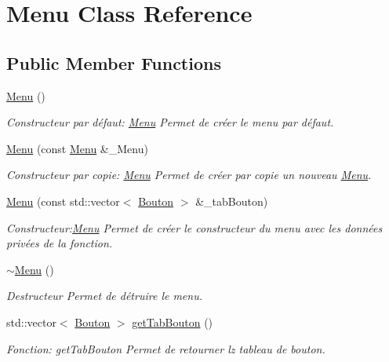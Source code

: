 \hypertarget{classMenu}{}\section{Menu Class Reference}
\label{classMenu}
\subsection*{Public Member Functions}
\begin{DoxyCompactItemize}
\item 
\hyperlink{classMenu_ad466dd83355124a6ed958430450bfe94}{Menu} ()
\begin{DoxyCompactList}\small\item\em Constructeur par défaut\+: \hyperlink{classMenu}{Menu} Permet de créer le menu par défaut. \end{DoxyCompactList}\item 
\hyperlink{classMenu_a255104f828234493ca62a43d144d2573}{Menu} (const \hyperlink{classMenu}{Menu} \&\+\_\+\+Menu)
\begin{DoxyCompactList}\small\item\em Constructeur par copie\+: \hyperlink{classMenu}{Menu} Permet de créer par copie un nouveau \hyperlink{classMenu}{Menu}. \end{DoxyCompactList}\item 
\hyperlink{classMenu_a51e725eafe16d272ea48c377a1d3aeff}{Menu} (const std\+::vector$<$ \hyperlink{classBouton}{Bouton} $>$ \&\+\_\+tab\+Bouton)
\begin{DoxyCompactList}\small\item\em Constructeur\+:\hyperlink{classMenu}{Menu} Permet de créer le constructeur du menu avec les données privées de la fonction. \end{DoxyCompactList}\item 
\mbox{\label{classMenu_a831387f51358cfb88cd018e1777bc980}} 
\hyperlink{classMenu_a831387f51358cfb88cd018e1777bc980}{$\sim$\+Menu} ()
\begin{DoxyCompactList}\small\item\em Destructeur Permet de détruire le menu. \end{DoxyCompactList}\item 
std\+::vector$<$ \hyperlink{classBouton}{Bouton} $>$ \hyperlink{classMenu_a6d80af8bd800d44072ddb63a80b911cd}{get\+Tab\+Bouton} ()
\begin{DoxyCompactList}\small\item\em Fonction\+: get\+Tab\+Bouton Permet de retourner lz tableau de bouton. \end{DoxyCompactList}\item 

\end{DoxyCompactItemize}
